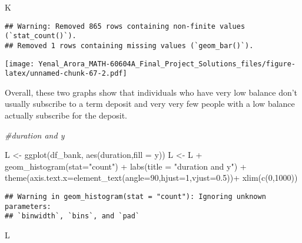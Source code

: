 \documentclass[
]{article}
\newenvironment{Shaded}{\begin{snugshade}}{\end{snugshade}}
\newcommand{\AttributeTok}[1]{\textcolor[rgb]{0.77,0.63,0.00}{#1}}
\newcommand{\CommentTok}[1]{\textcolor[rgb]{0.56,0.35,0.01}{\textit{#1}}}
\newcommand{\DecValTok}[1]{\textcolor[rgb]{0.00,0.00,0.81}{#1}}
\newcommand{\FloatTok}[1]{\textcolor[rgb]{0.00,0.00,0.81}{#1}}
\newcommand{\FunctionTok}[1]{\textcolor[rgb]{0.00,0.00,0.00}{#1}}
\newcommand{\NormalTok}[1]{#1}
\newcommand{\OtherTok}[1]{\textcolor[rgb]{0.56,0.35,0.01}{#1}}
\newcommand{\SpecialCharTok}[1]{\textcolor[rgb]{0.00,0.00,0.00}{#1}}
\newcommand{\StringTok}[1]{\textcolor[rgb]{0.31,0.60,0.02}{#1}}
\begin{document}
\begin{Shaded}
\begin{Highlighting}[]
\NormalTok{K}
\end{Highlighting}
\end{Shaded}

\begin{verbatim}
## Warning: Removed 865 rows containing non-finite values (`stat_count()`).
## Removed 1 rows containing missing values (`geom_bar()`).
\end{verbatim}

\texttt{[image: Yenal\_Arora\_MATH-60604A\_Final\_Project\_Solutions\_files/figure-latex/unnamed-chunk-67-2.pdf]}

Overall, these two graphs show that individuals who have very low
balance don't usually subscribe to a term deposit and very very few
people with a low balance actually subscribe for the deposit.

\begin{Shaded}
\begin{Highlighting}[]
\CommentTok{\#duration and y}

\NormalTok{L }\OtherTok{\textless{}{-}} \FunctionTok{ggplot}\NormalTok{(df\_bank, }\FunctionTok{aes}\NormalTok{(duration,}\AttributeTok{fill =}\NormalTok{ y))}
\NormalTok{L }\OtherTok{\textless{}{-}}\NormalTok{ L }\SpecialCharTok{+} \FunctionTok{geom\_histogram}\NormalTok{(}\AttributeTok{stat=}\StringTok{"count"}\NormalTok{) }\SpecialCharTok{+} \FunctionTok{labs}\NormalTok{(}\AttributeTok{title =} \StringTok{"duration and y"}\NormalTok{) }\SpecialCharTok{+}
  \FunctionTok{theme}\NormalTok{(}\AttributeTok{axis.text.x=}\FunctionTok{element\_text}\NormalTok{(}\AttributeTok{angle=}\DecValTok{90}\NormalTok{,}\AttributeTok{hjust=}\DecValTok{1}\NormalTok{,}\AttributeTok{vjust=}\FloatTok{0.5}\NormalTok{))}\SpecialCharTok{+} 
  \FunctionTok{xlim}\NormalTok{(}\FunctionTok{c}\NormalTok{(}\DecValTok{0}\NormalTok{,}\DecValTok{1000}\NormalTok{))}
\end{Highlighting}
\end{Shaded}

\begin{verbatim}
## Warning in geom_histogram(stat = "count"): Ignoring unknown parameters:
## `binwidth`, `bins`, and `pad`
\end{verbatim}

\begin{Shaded}
\begin{Highlighting}[]
\NormalTok{L}
\end{Highlighting}
\end{Shaded}
\end{document}
